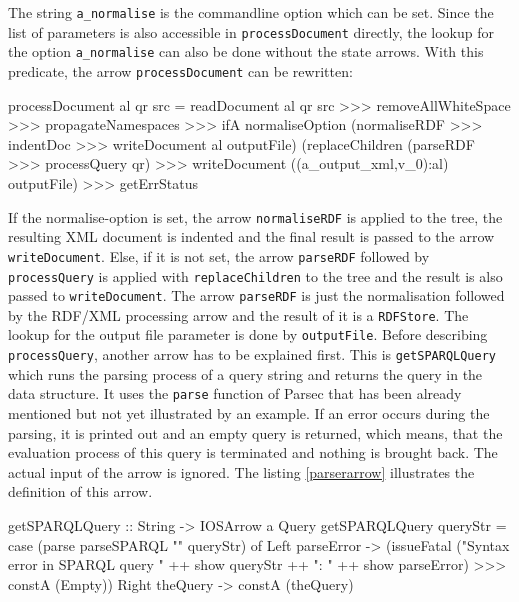 \documentclass[11pt,a4paper,headsepline, bibtotoc]{scrreprt}
\begin{document}
The string \texttt{a\_normalise} is the commandline option which can be set. Since the list of parameters is also accessible in \texttt{processDocument} directly, the lookup for the option \texttt{a\_normalise} can also be done without the state arrows. With this predicate, the arrow \texttt{processDocument} can be rewritten:
\enlargethispage{0.5cm}
\begin{code}[caption=Final processDocument]
processDocument al qr src
  = readDocument al qr src 
    >>> 
    removeAllWhiteSpace >>> propagateNamespaces 
    >>> 
    ifA normaliseOption 
        (normaliseRDF >>> indentDoc 
            >>> writeDocument al outputFile) 
        (replaceChildren (parseRDF >>> processQuery qr)
            >>> writeDocument ((a_output_xml,v_0):al) outputFile)
    >>>
    getErrStatus
\end{code}
If the normalise-option is set, the arrow \texttt{normaliseRDF} is applied to the tree, the resulting XML document is indented and the final result is passed to the arrow \texttt{writeDocument}. Else, if it is not set, the arrow \texttt{parseRDF} followed by \texttt{processQuery} is applied with \texttt{replaceChildren} to the tree and the result is also passed to \texttt{writeDocument}. The arrow \texttt{parseRDF} is just the normalisation followed by the RDF/XML processing arrow and the result of it is a \texttt{RDFStore}. The lookup for the output file parameter is done by \texttt{outputFile}. Before describing \texttt{processQuery}, another arrow has to be explained first. This is \texttt{getSPARQLQuery} which runs the parsing process of a query string and returns the query in the data structure. It uses the \texttt{parse} function of Parsec that has been already mentioned but not yet illustrated by an example. If an error occurs during the parsing, it is printed out and an empty query is returned, which means, that the evaluation process of this query is terminated and nothing is brought back. The actual input of the arrow is ignored. The listing \ref{parserarrow} illustrates the definition of this arrow.
\begin{code}[caption={Query Parser Arrow},label=parserarrow]
getSPARQLQuery :: String -> IOSArrow a Query 
getSPARQLQuery queryStr
  = case (parse parseSPARQL "" queryStr) of
    Left parseError
    -> (issueFatal ("Syntax error in SPARQL query " 
                        ++ show queryStr ++ ": " 
                        ++ show parseError) 
            >>> constA (Empty))
    Right theQuery
	-> constA (theQuery)
\end{code}
\end{document}
